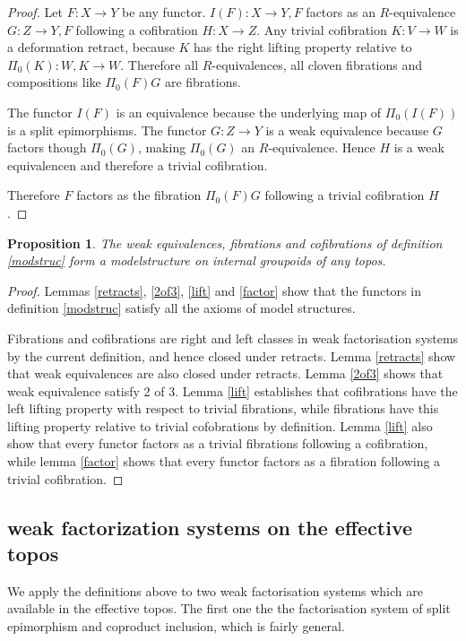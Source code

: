 \documentclass{amsart}
\theoremstyle{plain}
\newtheorem{prop}[theorem]{Proposition}
\theoremstyle{definition}
\begin{document}
\begin{proof} Let $F:X\to Y$ be any functor. $I(F):X\to Y\comma F$ factors as an $R$-equivalence $G:Z\to Y\comma F$ following a cofibration $H:X\to Z$. Any trivial cofibration $K: V\to W$ is a deformation retract, because $K$ has the right lifting property relative to $\Pi_0(K): W\comma K \to W$. Therefore all $R$-equivalences, all cloven fibrations and compositions like $\Pi_0(F)G$ are fibrations.%

The functor $I(F)$ is an equivalence because the underlying map of $\Pi_0(I(F))$ is a split epimorphisms. The functor $G:Z\to Y$ is a weak equivalence because $G$ factors though $\Pi_0(G)$, making $\Pi_0(G)$ an $R$-equivalence. Hence $H$ is a weak equivalencen and therefore a trivial cofibration.

Therefore $F$ factors as the fibration $\Pi_0(F)G$ following a trivial cofibration $H$.
\end{proof}

\begin{prop} The weak equivalences, fibrations and cofibrations of definition \ref{modstruc} form a modelstructure on internal groupoids of any topos. \end{prop}

\begin{proof} Lemmas \ref{retracts}, \ref{2of3}, \ref{lift} and \ref{factor} show that the functors in definition \ref{modstruc} satisfy all the axioms of model structures. 

Fibrations and cofibrations are right and left classes in weak factorisation systems by the current definition, and hence closed under retracts. Lemma \ref{retracts} show that weak equivalences are also closed under retracts. Lemma \ref{2of3} shows that weak equivalence satisfy 2 of 3. Lemma \ref{lift} establishes that cofibrations have the left lifting property with respect to trivial fibrations, while fibrations have this lifting property relative to trivial cofobrations by definition. Lemma \ref{lift} also show that every functor factors as a trivial fibrations following a cofibration, while lemma \ref{factor} shows that every functor factors as a fibration following a trivial cofibration. \end{proof}

\subsection{weak factorization systems on the effective topos}
We apply the definitions above to two weak factorisation systems which are available in the effective topos. The first one the the factorisation system of split epimorphism and coproduct inclusion, which is fairly general.
\end{document}
